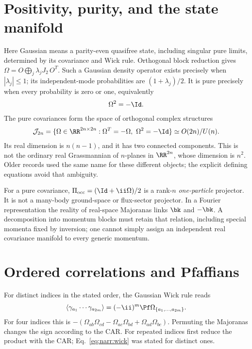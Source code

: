 \section{Positivity, purity, and the state manifold}
Here Gaussian means a parity-even quasifree state, including singular pure
limits, determined by its covariance and Wick rule. Orthogonal block reduction
gives $\Omega=O\bigoplus_j\lambda_jJ_2\,O^T$. Such a Gaussian density operator
exists precisely when $|\lambda_j|\leq1$; its independent-mode probabilities
are $(1+\lambda_j)/2$. It is pure precisely when every probability is zero or
one, equivalently
\begin{equation}
 \Omega^2=-\Id.
 \label{eq:narr:purity}
\end{equation}
The pure covariances form the space of orthogonal complex structures
\begin{equation}
 \mathcal J_{2n}=\{\Omega\in\RR^{2n\times2n}:\Omega^T=-\Omega,
       \ \Omega^2=-\Id\}\simeq O(2n)/U(n).
 \label{eq:narr:complex_structures}
\end{equation}
Its real dimension is $n(n-1)$, and it has two connected components. This is
not the ordinary real Grassmannian of $n$-planes in $\RR^{2n}$, whose dimension
is $n^2$. Older records used the same name for these different objects; the
explicit defining equations avoid that ambiguity.

For a pure covariance, $\Pi_{\rm occ}=(\Id+\ii\Omega)/2$ is a rank-$n$
\emph{one-particle} projector. It is not a many-body ground-space or flux-sector
projector. In a Fourier representation the reality of real-space Majoranas
links $\bk$ and $-\bk$. A decomposition into momentum blocks must retain that
relation, including special momenta fixed by inversion; one cannot simply
assign an independent real covariance manifold to every generic momentum.

\section{Ordered correlations and Pfaffians}
For distinct indices in the stated order, the Gaussian Wick rule reads
\begin{equation}
 \langle\gamma_{a_1}\cdots\gamma_{a_{2m}}\rangle
       =(-\ii)^m\Pf\Omega_{\{a_1,\ldots,a_{2m}\}}.
 \label{eq:narr:wick}
\end{equation}
For four indices this is
$-(\Omega_{ab}\Omega_{cd}-\Omega_{ac}\Omega_{bd}+\Omega_{ad}\Omega_{bc})$.
Permuting the Majoranas changes the sign according to the CAR. For repeated
indices first reduce the product with the CAR; Eq.~\eqref{eq:narr:wick} was
stated for distinct ones.

